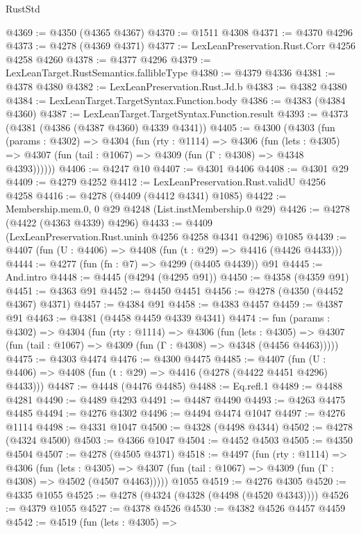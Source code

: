 \begin{lexlean}{RustStd}
\begin{coremodule}
@4369 := @4350 (@4365 @4367)
@4370 := @1511 @4308
@4371 := @4370 @4296
@4373 := @4278 (@4369 @4371)
@4377 := LexLeanPreservation.Rust.Corr @4256 @4258 @4260
@4378 := @4377 @4296
@4379 := LexLeanTarget.RustSemantics.fallibleType
@4380 := @4379 @4336
@4381 := @4378 @4380
@4382 := LexLeanPreservation.Rust.Jd.b
@4383 := @4382 @4380
@4384 := LexLeanTarget.TargetSyntax.Function.body
@4386 := @4383 (@4384 @4360)
@4387 := LexLeanTarget.TargetSyntax.Function.result
@4393 := @4373 (@4381 (@4386 (@4387 @4360) @4339 @4341))
@4405 := @4300
    (@4303
      (fun (params : @4302) =>
      @4304
        (fun (rty : @1114) =>
        @4306
          (fun (lets : @4305) =>
          @4307 (fun (tail : @1067) => @4309 (fun (Γ : @4308) => @4348 @4393))))))
@4406 := @4247 @10
@4407 := @4301 @4406
@4408 := @4301 @29
@4409 := @4279 @4252
@4412 := LexLeanPreservation.Rust.validU @4256 @4258
@4416 := @4278 (@4409 (@4412 @4341) @1085)
@4422 := Membership.mem.{0, 0} @29 @4248 (List.instMembership.{0} @29)
@4426 := @4278 (@4422 (@4363 @4339) @4296)
@4433 := @4409 (LexLeanPreservation.Rust.uninh @4256 @4258 @4341 @4296) @1085
@4439 := @4407 (fun (U : @4406) => @4408 (fun (t : @29) => @4416 (@4426 @4433)))
@4444 := @4277 (fun (fn : @7) => @4299 (@4405 @4439)) @91
@4445 := And.intro
@4448 := @4445 (@4294 (@4295 @91))
@4450 := @4358 (@4359 @91)
@4451 := @4363 @91
@4452 := @4450 @4451
@4456 := @4278 (@4350 (@4452 @4367) @4371)
@4457 := @4384 @91
@4458 := @4383 @4457
@4459 := @4387 @91
@4463 := @4381 (@4458 @4459 @4339 @4341)
@4474 := fun (params : @4302) =>
  @4304
    (fun (rty : @1114) =>
    @4306
      (fun (lets : @4305) =>
      @4307 (fun (tail : @1067) => @4309 (fun (Γ : @4308) => @4348 (@4456 @4463)))))
@4475 := @4303 @4474
@4476 := @4300 @4475
@4485 := @4407 (fun (U : @4406) => @4408 (fun (t : @29) => @4416 (@4278 (@4422 @4451 @4296) @4433)))
@4487 := @4448 (@4476 @4485)
@4488 := Eq.refl.{1}
@4489 := @4488 @4281
@4490 := @4489 @4293
@4491 := @4487 @4490
@4493 := @4263 @4475 @4485
@4494 := @4276 @4302
@4496 := @4494 @4474 @1047
@4497 := @4276 @1114
@4498 := @4331 @1047
@4500 := @4328 (@4498 @4344)
@4502 := @4278 (@4324 @4500)
@4503 := @4366 @1047
@4504 := @4452 @4503
@4505 := @4350 @4504
@4507 := @4278 (@4505 @4371)
@4518 := @4497
    (fun (rty : @1114) =>
    @4306
      (fun (lets : @4305) =>
      @4307 (fun (tail : @1067) => @4309 (fun (Γ : @4308) => @4502 (@4507 @4463)))))
    @1055
@4519 := @4276 @4305
@4520 := @4335 @1055
@4525 := @4278 (@4324 (@4328 (@4498 (@4520 @4343))))
@4526 := @4379 @1055
@4527 := @4378 @4526
@4530 := @4382 @4526 @4457 @4459
@4542 := @4519
    (fun (lets : @4305) =>

\end{coremodule}
\end{lexlean}
